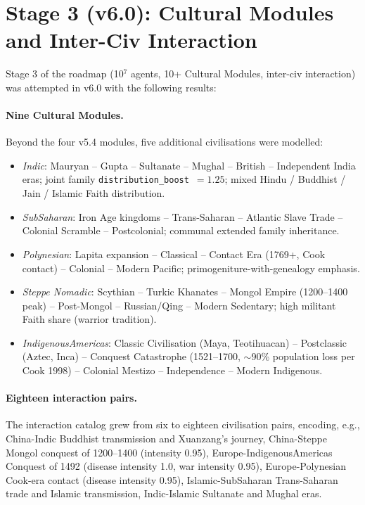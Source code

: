 \section{Stage 3 (v6.0): Cultural Modules and Inter-Civ Interaction}
\label{sec:stage3-v60}

Stage 3 of the roadmap (10$^7$ agents, 10+ Cultural Modules,
inter-civ interaction) was attempted in v6.0 with the following
results:

\paragraph{Nine Cultural Modules.}
Beyond the four v5.4 modules, five additional civilisations were
modelled:
\begin{itemize}
\item \emph{Indic}: Mauryan -- Gupta -- Sultanate -- Mughal --
  British -- Independent India eras; joint family
  \texttt{distribution\_boost}~$=1.25$; mixed Hindu / Buddhist /
  Jain / Islamic Faith distribution.
\item \emph{SubSaharan}: Iron Age kingdoms -- Trans-Saharan --
  Atlantic Slave Trade -- Colonial Scramble -- Postcolonial;
  communal extended family inheritance.
\item \emph{Polynesian}: Lapita expansion -- Classical --
  Contact Era (1769+, Cook contact) -- Colonial -- Modern Pacific;
  primogeniture-with-genealogy emphasis.
\item \emph{Steppe Nomadic}: Scythian -- Turkic Khanates --
  Mongol Empire (1200--1400 peak) -- Post-Mongol -- Russian/Qing
  -- Modern Sedentary; high militant Faith share (warrior tradition).
\item \emph{IndigenousAmericas}: Classic Civilisation
  (Maya, Teotihuacan) -- Postclassic (Aztec, Inca) -- Conquest
  Catastrophe (1521--1700, $\sim$90\% population loss per Cook
  1998) -- Colonial Mestizo -- Independence -- Modern Indigenous.
\end{itemize}

\paragraph{Eighteen interaction pairs.}
The interaction catalog grew from six to eighteen civilisation
pairs, encoding, e.g., China-Indic Buddhist transmission and
Xuanzang's journey, China-Steppe Mongol conquest of 1200--1400
(intensity 0.95), Europe-IndigenousAmericas Conquest of 1492
(disease intensity 1.0, war intensity 0.95), Europe-Polynesian
Cook-era contact (disease intensity 0.95), Islamic-SubSaharan
Trans-Saharan trade and Islamic transmission, Indic-Islamic
Sultanate and Mughal eras.

